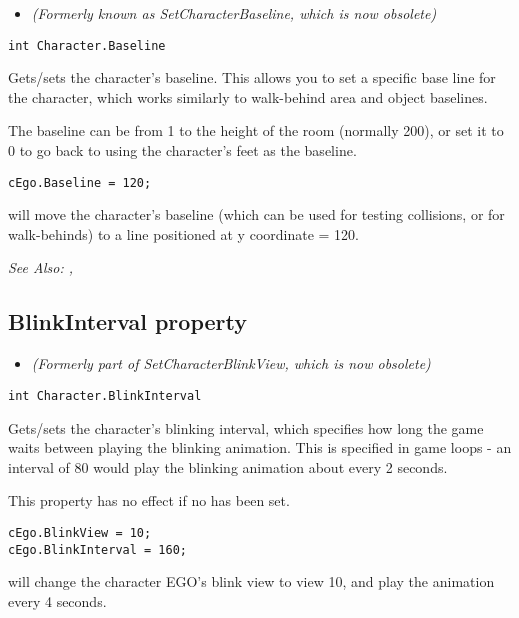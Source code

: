 \begin{itemize}
\item \it{(Formerly known as SetCharacterBaseline, which is now obsolete)}
\end{itemize}

\begin{verbatim}
int Character.Baseline
\end{verbatim}
Gets/sets the character's baseline. This allows you to set a specific
base line for the character, which works similarly to walk-behind area and
object baselines.

The baseline can be from 1 to the height of the room (normally 200), or set it
to 0 to go back to using the character's feet as the baseline.

\begin{verbatim}
cEgo.Baseline = 120;
\end{verbatim}
will move the character's baseline (which can be used for testing collisions,
or for walk-behinds) to a line positioned at y coordinate = 120.

\it{See Also:} , 



\subsection{BlinkInterval property}\label{Character.BlinkInterval}%

\begin{itemize}
\item \it{(Formerly part of SetCharacterBlinkView, which is now obsolete)}
\end{itemize}

\begin{verbatim}
int Character.BlinkInterval
\end{verbatim}
Gets/sets the character's blinking interval, which specifies how long the game waits
between playing the blinking animation. This is specified in game loops - an interval
of 80 would play the blinking animation about every 2 seconds.

This property has no effect if no  has been set.

\begin{verbatim}
cEgo.BlinkView = 10;
cEgo.BlinkInterval = 160;
\end{verbatim}
will change the character EGO's blink view to view 10, and play the animation every 4 seconds.

